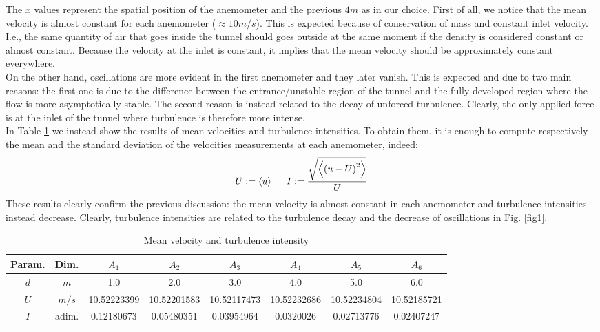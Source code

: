 \documentclass[11pt,titlepage]{article}
\begin{document}
The $x$ values represent the spatial position of the anemometer and the previous $4m$ as in our choice. First of all, we notice that the mean velocity is almost constant for each anemometer ($\approx 10m/s$). This is expected because of conservation of mass and constant inlet velocity. I.e., the same quantity of air that goes inside the tunnel should goes outside at the same moment if the density is considered constant or almost constant. Because the velocity at the inlet is constant, it implies that the mean velocity should be approximately constant everywhere. \\
On the other hand, oscillations are more evident in the first anemometer and they later vanish. This is expected and due to two main reasons: the first one is due to the difference between the entrance/unstable region of the tunnel and the fully-developed region where the flow is more asymptotically stable. The second reason is instead related to the decay of unforced turbulence. Clearly, the only applied force is at the inlet of the tunnel where turbulence is therefore more intense. \\
In Table \ref{table1} we instead show the results of mean velocities and turbulence intensities. To obtain them, it is enough to compute respectively the mean and the standard deviation of the velocities measurements at each anemometer, indeed:
\begin{equation*}
	U:=\left<u\right> \hspace{5mm}	I := \frac{\sqrt{\left<\left(u-U\right)^2\right>}}{U}
\end{equation*}
These results clearly confirm the previous discussion: the mean velocity is almost constant in each anemometer and turbulence intensities instead decrease. Clearly, turbulence intensities are related to the turbulence decay and the decrease of oscillations in Fig. \ref{fig1}.

\begin{table} [h]
\centering
\caption{Mean velocity and turbulence intensity} \label{table1}
    \begin{tabular}{ | c | c | c | c | c | c | c | c |}
        \hline
        Param. & Dim. & $A_1$ & $A_2$ & $A_3$ & $A_4$ & $A_5$ & $A_6$ \\
        \hline
        $d$ & $m$ & 1.0 & 2.0 & 3.0 & 4.0 & 5.0 & 6.0 \\
        \hline
        $U$ & $m/s$&10.52223399 &10.52201583&10.52117473 &10.52232686& 10.52234804& 10.52185721 \\
        \hline
        $I$ & adim.& 0.12180673& 0.05480351& 0.03954964 &0.0320026  &0.02713776& 0.02407247 \\
        \hline
    \end{tabular}
\end{table}
\end{document}
